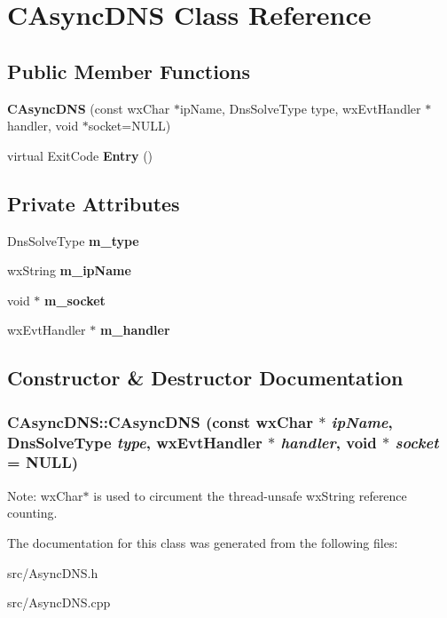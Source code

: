 \section{CAsyncDNS Class Reference}
\label{classCAsyncDNS}
\subsection*{Public Member Functions}
\begin{DoxyCompactItemize}
\item 
{\bf CAsyncDNS} (const wxChar $\ast$ipName, DnsSolveType type, wxEvtHandler $\ast$handler, void $\ast$socket=NULL)
\item 
virtual ExitCode {\bfseries Entry} ()\label{classCAsyncDNS_ac4ee53ddad5b8c2df780a9f2d9ca77ba}

\end{DoxyCompactItemize}
\subsection*{Private Attributes}
\begin{DoxyCompactItemize}
\item 
DnsSolveType {\bfseries m\_\-type}\label{classCAsyncDNS_ad1acb081f6c79a3557407a15e6aa92d4}

\item 
wxString {\bfseries m\_\-ipName}\label{classCAsyncDNS_a76933cb7d99bb8a6d36bff40a40d2136}

\item 
void $\ast$ {\bfseries m\_\-socket}\label{classCAsyncDNS_adb569142816ef4fe9056a2d30613ef8c}

\item 
wxEvtHandler $\ast$ {\bfseries m\_\-handler}\label{classCAsyncDNS_ae5d853a40a805b9b423340f2f5872d2d}

\end{DoxyCompactItemize}


\subsection{Constructor \& Destructor Documentation}
\subsubsection[{CAsyncDNS}]{\setlength{\rightskip}{0pt plus 5cm}CAsyncDNS::CAsyncDNS (const wxChar $\ast$ {\em ipName}, \/  DnsSolveType {\em type}, \/  wxEvtHandler $\ast$ {\em handler}, \/  void $\ast$ {\em socket} = {\ttfamily NULL})}\label{classCAsyncDNS_a2a41c4fd4074790bbb4eef183db90d3a}


Note: wxChar$\ast$ is used to circument the thread-\/unsafe wxString reference counting. 

The documentation for this class was generated from the following files:\begin{DoxyCompactItemize}
\item 
src/AsyncDNS.h\item 
src/AsyncDNS.cpp\end{DoxyCompactItemize}
